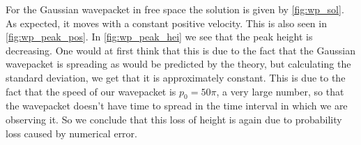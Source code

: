 \documentclass[10pt,a4paper,twocolumn]{article}
\begin{document}
For the Gaussian wavepacket in free space the solution is given by \cref{fig:wp_sol}. As expected, it moves with a constant positive velocity. This is also seen in \cref{fig:wp_peak_pos}. In \cref{fig:wp_peak_hei} we see that the peak height is decreasing. One would at first think that this is due to the fact that the Gaussian wavepacket is spreading as would be predicted by the theory, but calculating the standard deviation, we get that it is approximately constant. This is due to the fact that the speed of our wavepacket is $p_0 = 50 \pi$, a very large number, so that the wavepacket doesn't have time to spread in the time interval in which we are observing it. So we conclude that this loss of height is again due to probability loss caused by numerical error.  


\nocite{1}
\nocite{Dijk2007AccurateNS}

\printbibliography
\end{document}
